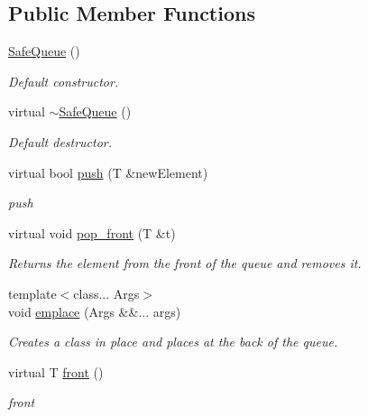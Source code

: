 \subsection*{Public Member Functions}
\begin{DoxyCompactItemize}
\item 
\mbox{\hyperlink{classSafeContainers_1_1SafeQueue_a1277b40465c772d1c4259d3e60f13b32}{Safe\+Queue}} ()
\begin{DoxyCompactList}\small\item\em Default constructor. \end{DoxyCompactList}\item 
\mbox{\label{classSafeContainers_1_1SafeQueue_a2f7c58737d1664285490e1bb022884c1}} 
virtual \mbox{\hyperlink{classSafeContainers_1_1SafeQueue_a2f7c58737d1664285490e1bb022884c1}{$\sim$\+Safe\+Queue}} ()
\begin{DoxyCompactList}\small\item\em Default destructor. \end{DoxyCompactList}\item 
virtual bool \mbox{\hyperlink{classSafeContainers_1_1SafeQueue_acfc992d0de4affd870cb10e59a2a9cdf}{push}} (T \&new\+Element)
\begin{DoxyCompactList}\small\item\em push \end{DoxyCompactList}\item 
virtual void \mbox{\hyperlink{classSafeContainers_1_1SafeQueue_ab9585ee25f60058a590c7920b7a36711}{pop\+\_\+front}} (T \&t)
\begin{DoxyCompactList}\small\item\em Returns the element from the front of the queue and removes it. \end{DoxyCompactList}\item 
{\footnotesize template$<$class... Args$>$ }\\void \mbox{\hyperlink{classSafeContainers_1_1SafeQueue_ace84e1b0979f17b49988d6175b89f0d0}{emplace}} (Args \&\&... args)
\begin{DoxyCompactList}\small\item\em Creates a class in place and places at the back of the queue. \end{DoxyCompactList}\item 
virtual T \mbox{\hyperlink{classSafeContainers_1_1SafeQueue_acbd797ab283f7243a1b79ad84be83b03}{front}} ()
\begin{DoxyCompactList}\small\item\em front \end{DoxyCompactList}\item 

\end{DoxyCompactItemize}
